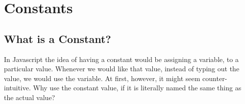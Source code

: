 \maketitle{}
\section{ Constants }

\subsection{ What is a Constant? }
In Javascript the idea of having a constant would be assigning a variable, to a
particular value. Whenever we would like that value, instead of typing out the
value, we would use the variable. At first, however, it might seem
counter-intuitive. Why use the constant value, if it is literally named the same
thing as the actual value? 
